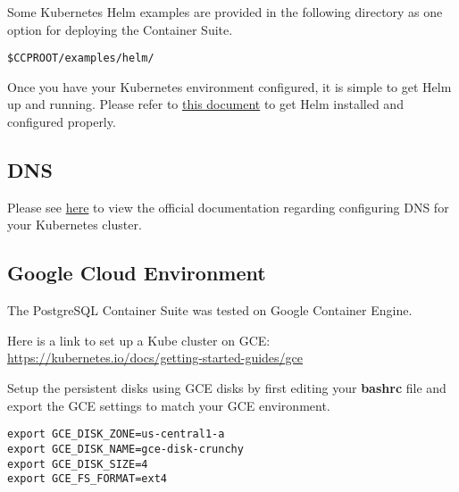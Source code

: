 \documentclass[letterpaper,12pt]{article}
\begin{document}
Some Kubernetes Helm examples are provided in the following directory as one option for deploying the Container Suite.
\vspace{.75em}
\begin{lstlisting}
$CCPROOT/examples/helm/
\end{lstlisting}

Once you have your Kubernetes environment configured, it is simple to get Helm up and running. Please refer to \href{https://github.com/kubernetes/helm/blob/master/docs/install.md}{this document} to get Helm installed and configured properly.

\subsection{DNS}\label{/_kubernetes_environment/_dns}

Please see \href{https://kubernetes.io/docs/concepts/services-networking/dns-pod-service/}{here} to view the official documentation regarding configuring DNS for your Kubernetes cluster.

\subsection{Google Cloud Environment}\label{/_kubernetes_environment/_google_cloud_environment}

The PostgreSQL Container Suite was tested on Google Container Engine.

Here is a link to set up a Kube cluster on GCE: \href{https://kubernetes.io/docs/getting-started-guides/gce}{https://kubernetes.io/docs/getting-started-guides/gce}

Setup the persistent disks using GCE disks by first editing your \textbf{bashrc} file and export the GCE settings to match your GCE environment.
\vspace{.75em}
\begin{lstlisting}
export GCE_DISK_ZONE=us-central1-a
export GCE_DISK_NAME=gce-disk-crunchy
export GCE_DISK_SIZE=4
export GCE_FS_FORMAT=ext4
\end{lstlisting}
\end{document}
